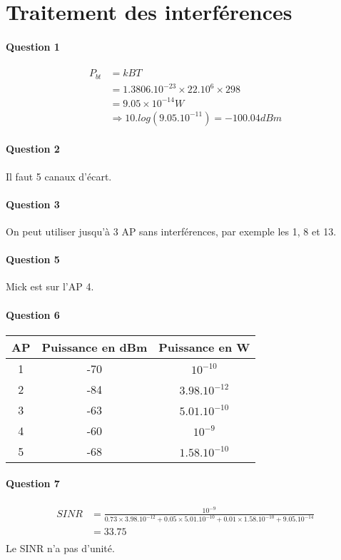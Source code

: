 \chapter{Traitement des interférences}
\subsubsection{Question 1}
\begin{align*}
P_{bt} &= kBT\\
       &= 1.3806 . 10^{-23} \times 22 . 10^6 \times 298\\
       &= 9.05 \times 10^{-14} W\\
       &\Rightarrow 10.log(9.05.10^{-11}) = -100.04 dBm
\end{align*}
\subsubsection{Question 2}
Il faut 5 canaux d'écart.

\subsubsection{Question 3}
On peut utiliser jusqu'à 3 AP sans interférences, par exemple les 1, 8 et 13.

\subsubsection{Question 5}
Mick est sur l'AP 4.

\subsubsection{Question 6}
\begin{center}
\begin{tabular}{|c|c|c|}
\hline
AP & Puissance en dBm & Puissance en W\\
\hline
1  &       -70        &   $10^{-10}$\\
\hline
2  &       -84        &   $3.98.10^{-12}$\\
\hline
3  &       -63        &   $5.01.10^{-10}$\\
\hline
4  &       -60        &   $10^{-9}$\\
\hline
5  &       -68        &   $1.58.10^{-10}$\\
\hline
\end{tabular}
\end{center}

\subsubsection{Question 7}
\begin{align*}
SINR &= \frac{10^{-9}}{0.73 \times 3.98.10^{-12} + 0.05 \times 5.01 .
  10^{-10} + 0.01 \times 1.58.10^{-10} + 9.05.10^{-14}}\\
    &= 33.75\\
\end{align*}
Le SINR n'a pas d'unité.\\

